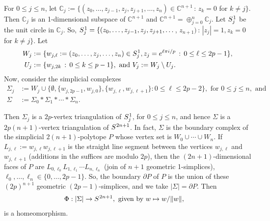 \documentclass[12pt]{article}
\theoremstyle{theorem}
\theoremstyle{definition}
\begin{document}
For $0\leq j\leq n$, let $\mathbb{C}_j := \{(z_0, \dots, z_{j-1}, z_j, z_{j+1}, \dots, z_{n})\in \mathbb{C}^{n+1} \, : \, z_{k} = 0$ for $k\neq j\}$. Then $\mathbb{C}_j$ is an 1-dimensional subspace of $\mathbb{C}^{n+1}$ and $\mathbb{C}^{n+1} = \oplus_{j=0}^n\mathbb{C}_j$. Let $S_j^{\hspace{.2mm}1}$ be the unit circle in  $\mathbb{C}_j$. So, $S_j^{\hspace{.2mm}1} = \{(z_0, \dots, z_{j-1}, z_j, z_{j+1}, \dots$, $z_{n+1}) \, : \, |z_j|=1, z_k= 0$ for $k\neq j\}$. Let  
\begin{align*}
W_j &:= \{w_{j, \ell} := (z_0, \dots, z_{j}, \dots, z_{n})\in S_j^{\hspace{.2mm}1},   z_j = e^{\ell\pi i/p} \, : \, 0\leq \ell \leq 2p-1\}, \\
U_j &:= \{w_{j,2k} \, : \, 0\leq k\leq p-1\}, \mbox{ and } V_j  := W_j\setminus U_j. 
\end{align*}
Now, consider the simplicial complexes 
\begin{align}\label{eq:Sigma}
\Sigma_j & := W_j \cup \{\emptyset,  \{w_{j,2p-1}, w_{j,0}\}, \{w_{j,\ell}, w_{j,\ell+1}\} : 0\leq \ell \leq 2p-2\}, \mbox{ for } 0\leq j\leq n,  \mbox{ and} \nonumber \\
\Sigma & := \Sigma_0 \ast \Sigma_1\ast \cdots \ast \Sigma_n. 
\end{align}

Then $\Sigma_j$ is a $2p$-vertex triangulation of $S_j^{\hspace{.2mm}1}$, for $0\leq j\leq n$, and hence $\Sigma$ is a $2p(n+1)$-vertex triangulation of $S^{\hspace{.2mm}2n+1}$.  
In fact,  $\Sigma$ is the boundary complex of the simplicial $2(n+1)$-polytope $P$ whose vertex set is $W_0\cup\cdots\cup W_n$. If $L_{j,\ell} := w_{j,\ell}w_{j, \ell+1}$ is the straight line segment between the vertices $w_{j,\ell}$ and $w_{j, \ell+1}$ (additions in the suffices are modulo $2p$), then the $(2n+1)$-dimensional faces of $P$ are $L_{0,\ell_0}L_{1,\ell_1}\cdots L_{n,\ell_{n}}$ (join of $n+1$ geometric 1-simplices), $\ell_0, \dots, \ell_n\in \{0, \dots, 2p-1\}$. So, the boundary  $\partial P$ of $P$ is the union of these $(2p)^{n+1}$ geometric $(2p-1)$-simplices, and we take $|\Sigma| = \partial P$. Then 
\begin{align}\label{eq:Phi}
\Phi & :  |\Sigma| \to S^{\hspace{.2mm}2n+1}, \mbox{ given by } 
  w \mapsto w/\|w\|, 
 \end{align}
 is a homeomorphism. 
\end{document}
